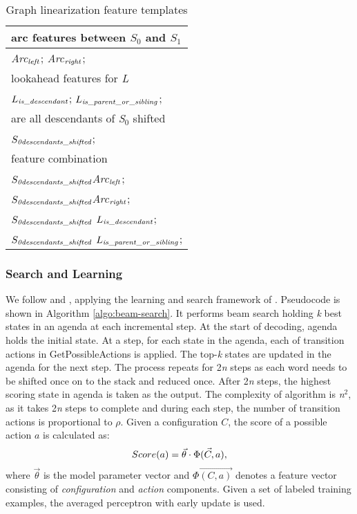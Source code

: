 \documentclass[11pt]{article}
\begin{document}
\begin{table}\centering
\footnotesize
\begin{tabularx}{.45\textwidth}{X}
\hline 
arc features between $S_0$ and $S_1$ \\
\hline
{\it Arc$_{\it{left}}$}; {\it Arc$_{\it{right}}$}; \\
\hline
\hline
lookahead features for {\it L} \\
\hline
$L_{\it is\_descendant}$; $L_{\it is\_parent\_or\_sibling}$; \\
\hline
\hline
are all descendants of {\it S$_0$} shifted\\
\hline
$S_{\it{0descendants\_shifted}}$;\\
\hline
\hline
feature combination \\
\hline
$S_{\it{0descendants\_shifted}}${\it Arc}$_{\it left}$; \\
$S_{\it{0descendants\_shifted}}${\it Arc}$_{\it{right}}$;\\
$S_{\it{0descendants\_shifted}}$ $L_{\it{is\_descendant}}$; \\
$S_{\it{0descendants\_shifted}}$ $L_{\it{is\_parent\_or\_sibling}}$; \\
\hline 

\end{tabularx}
\caption{Graph linearization feature templates}
\label{tab:new-features-templates}
\end{table}

\subsubsection{Search and Learning}
  We follow  and , applying the learning and search framework of . Pseudocode is shown in Algorithm \ref{algo:beam-search}. It performs beam search holding {\it k} best states in an agenda at each incremental step. At the start of decoding, agenda holds the initial state. At a step, for each state in the agenda, each of transition actions in {\sc GetPossibleActions} is applied. The top-{\it k} states are updated in the agenda for the next step. The process repeats for 2{\it n} steps as each word needs to be shifted once on to the stack and reduced once. After 2{\it n} steps, the highest scoring state in agenda is taken as the output. The complexity of algorithm is {\it n}$^2$, as it takes 2{\it n} steps to complete and during each step, the number of transition actions is proportional to $\rho$.
  Given a configuration $C$, the score of a possible action $a$ is calculated as: \vspace*{-0.3em}
  \[Score(a)=\vec{\theta} \cdot \vec{\Phi(C,a)} ,\vspace*{-0.3em}\]
  where $\vec{\theta}$ is the model parameter vector and $\vec{\Phi(C,a)}$ denotes a feature vector consisting of {\it configuration} and {\it action} components. Given a set of labeled training examples, the averaged perceptron with early update \cite{collins2004incremental} is used.
\end{document}
